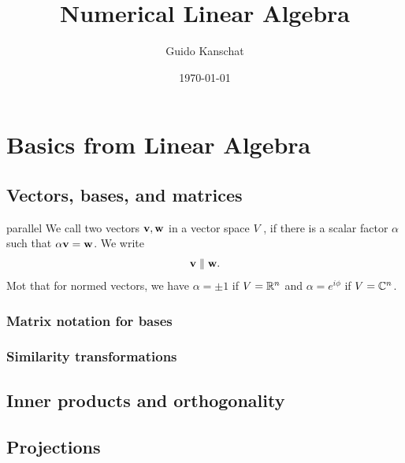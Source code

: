 \usepackage{algpseudocode}
\lstset{language=Python,numbers=left,resetmargins=true,xleftmargin=8pt,basicstyle=\small,numberstyle=\scriptsize}
\usetikzlibrary{svg.path}
\usetikzlibrary{matrix,fit}


\title{Numerical Linear Algebra}
\author{Guido Kanschat}
\date{\today}

\def\esp#1{V_{#1}}



\maketitle
\tableofcontents





\appendix
\chapter{Basics from Linear Algebra}
\section{Vectors, bases, and matrices}

\begin{Definition}{parallel}
  We call two vectors $\mathbf v,\mathbf w$ in a vector space $V$ , if
  there is a scalar factor $\alpha$ such that $\alpha \mathbf v=\mathbf w$. We write
  \begin{gather}
    \mathbf v\parallel\mathbf w.
  \end{gather}
  Mot that for normed vectors, we have $\alpha = \pm1$ if $V=\mathbb R^n$ and
  $\alpha = e^{i\phi}$ if $V=\mathbb C^n$.
\end{Definition}

\subsection{Matrix notation for bases}

\subsection{Similarity transformations}

\section{Inner products and orthogonality}

\section{Projections}

